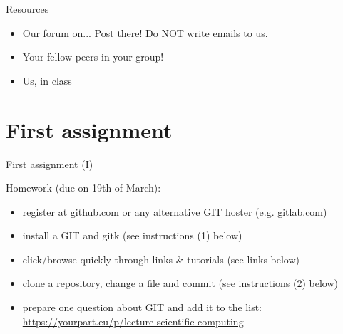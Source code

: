 \documentclass[10pt,color=usenames,dvipsnames]{beamer}
\begin{document}
\begin{frame}{Resources}
	
	\begin{itemize}
		\item Our forum on... Post there! Do NOT write emails to us.
		\item Your fellow peers in your group!
		\item Us, in class
	\end{itemize}


\end{frame}

\section{First assignment}

\begin{frame}{First assignment (I)}

Homework (due on 19th of March):

\begin{itemize}
	
	\item register at github.com or any alternative GIT hoster (e.g. gitlab.com)
	\item install a GIT and gitk (see instructions (1) below)
	\item click/browse quickly through links \& tutorials (see links below)
	\item  clone a repository, change a file and commit (see instructions (2) below)
	\item prepare one question about GIT and add it to the list: \href{https://yourpart.eu/p/lecture-scientific-computing}{https://yourpart.eu/p/lecture-scientific-computing}

\end{itemize}


\end{frame}
\end{document}
